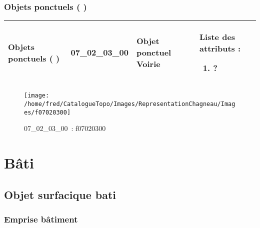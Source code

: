 \documentclass[12pt,titlepage]{book}
\begin{document}
\subsection{Objets ponctuels ( )}
\noindent
\vspace{\baselineskip}

\renewcommand{\arraystretch}{1.2}
\begin{supertabular}{|p{10cm}|c|p{13cm}|p{12cm}|}
 Objets ponctuels ( ) & 07\_02\_03\_00 & Objet ponctuel Voirie & Liste des attributs :
\begin{enumerate}
  \item ?\end{enumerate}
\\
\hline
\end{supertabular}
\begin{figure}[h!]
  \hfill         %
  \begin{minipage}[t]{3cm}
    \begin{center}
      \texttt{[image: /home/fred/CatalogueTopo/Images/RepresentationChagneau/Images/f07020300]}
      \caption[~07\_02\_03\_00]{\small{07\_02\_03\_00~:} \tiny{f07020300}}\label{f07020300}
    \end{center}
  \end{minipage}
\end{figure}
\chapter{Bâti}
\section{\large Objet surfacique bati}
\subsection{Emprise bâtiment}
\noindent
\vspace{\baselineskip}
\end{document}
